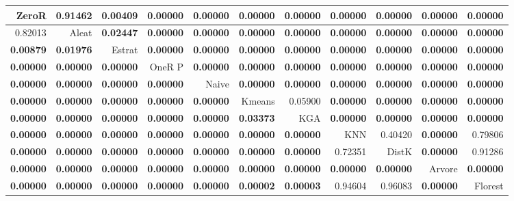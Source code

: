 \begin{table}
\centering
\label{Digitsteste_pareado_table}
\begin{tabular}{rrrrrrrrrrr}
\toprule
         ZeroR &          0.91462 & \textbf{0.00409} & \textbf{0.00000} & \textbf{0.00000} & \textbf{0.00000} & \textbf{0.00000} & \textbf{0.00000} & \textbf{0.00000} & \textbf{0.00000} & \textbf{0.00000} \\ \hline
         0.82013 &          Aleat & \textbf{0.02447} & \textbf{0.00000} & \textbf{0.00000} & \textbf{0.00000} & \textbf{0.00000} & \textbf{0.00000} & \textbf{0.00000} & \textbf{0.00000} & \textbf{0.00000} \\ \hline
\textbf{0.00879} & \textbf{0.01976} &          Estrat & \textbf{0.00000} & \textbf{0.00000} & \textbf{0.00000} & \textbf{0.00000} & \textbf{0.00000} & \textbf{0.00000} & \textbf{0.00000} & \textbf{0.00000} \\ \hline
\textbf{0.00000} & \textbf{0.00000} & \textbf{0.00000} &          OneR P & \textbf{0.00000} & \textbf{0.00000} & \textbf{0.00000} & \textbf{0.00000} & \textbf{0.00000} & \textbf{0.00000} & \textbf{0.00000} \\ \hline
\textbf{0.00000} & \textbf{0.00000} & \textbf{0.00000} & \textbf{0.00000} &          Naive & \textbf{0.00000} & \textbf{0.00000} & \textbf{0.00000} & \textbf{0.00000} & \textbf{0.00000} & \textbf{0.00000} \\ \hline
\textbf{0.00000} & \textbf{0.00000} & \textbf{0.00000} & \textbf{0.00000} & \textbf{0.00000} &          Kmeans &          0.05900 & \textbf{0.00000} & \textbf{0.00000} & \textbf{0.00000} & \textbf{0.00000} \\ \hline
\textbf{0.00000} & \textbf{0.00000} & \textbf{0.00000} & \textbf{0.00000} & \textbf{0.00000} & \textbf{0.03373} &          KGA & \textbf{0.00000} & \textbf{0.00000} & \textbf{0.00000} & \textbf{0.00000} \\ \hline
\textbf{0.00000} & \textbf{0.00000} & \textbf{0.00000} & \textbf{0.00000} & \textbf{0.00000} & \textbf{0.00000} & \textbf{0.00000} &          KNN &          0.40420 & \textbf{0.00000} &          0.79806 \\ \hline
\textbf{0.00000} & \textbf{0.00000} & \textbf{0.00000} & \textbf{0.00000} & \textbf{0.00000} & \textbf{0.00000} & \textbf{0.00000} &          0.72351 &          DistK & \textbf{0.00000} &          0.91286 \\ \hline
\textbf{0.00000} & \textbf{0.00000} & \textbf{0.00000} & \textbf{0.00000} & \textbf{0.00000} & \textbf{0.00000} & \textbf{0.00000} & \textbf{0.00000} & \textbf{0.00000} &          Arvore & \textbf{0.00000} \\ \hline
\textbf{0.00000} & \textbf{0.00000} & \textbf{0.00000} & \textbf{0.00000} & \textbf{0.00000} & \textbf{0.00002} & \textbf{0.00003} &          0.94604 &          0.96083 & \textbf{0.00000} &          Florest \\ \hline
\bottomrule
\end{tabular}
\end{table}
